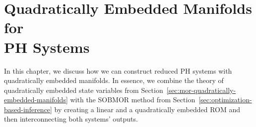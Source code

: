 \chapter[Quadratically Embedded Manifolds for \texorpdfstring{\acl{PH}}{PH} Systems]{%
    Quadratically Embedded Manifolds for \\
    \texorpdfstring{\acl{PH}}{PH} Systems%
}\label{chap:quadratically-embedded-manifolds-ph-systems}

In this chapter, we discuss how we can construct reduced \ac{PH} systems with quadratically embedded manifolds.
In essence, we combine the theory of quadratically embedded state variables from Section~\ref{sec:mor-quadratically-embedded-manifolds} with the \ac{SOBMOR} method from Section~\ref{sec:optimization-based-inference} by creating a linear and a quadratically embedded \ac{ROM} and then interconnecting both systems' outputs.

